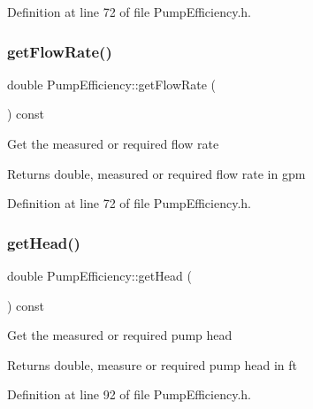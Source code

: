 Definition at line 72 of file Pump\+Efficiency.\+h.

\mbox{\label{class_pump_efficiency_a715c4ade497e99640f09546fad6479bc}} 
\subsubsection{\texorpdfstring{get\+Flow\+Rate()}{getFlowRate()}\hspace{0.1cm}{\footnotesize\ttfamily [3/3]}}
{\footnotesize\ttfamily double Pump\+Efficiency\+::get\+Flow\+Rate (\begin{DoxyParamCaption}{ }\end{DoxyParamCaption}) const\hspace{0.3cm}{\ttfamily [inline]}}

Get the measured or required flow rate

\begin{DoxyReturn}{Returns}
double, measured or required flow rate in gpm 
\end{DoxyReturn}


Definition at line 72 of file Pump\+Efficiency.\+h.

\mbox{\label{class_pump_efficiency_aa89f7727e67b3e0d20149eee66d10f69}} 
\subsubsection{\texorpdfstring{get\+Head()}{getHead()}\hspace{0.1cm}{\footnotesize\ttfamily [1/3]}}
{\footnotesize\ttfamily double Pump\+Efficiency\+::get\+Head (\begin{DoxyParamCaption}{ }\end{DoxyParamCaption}) const\hspace{0.3cm}{\ttfamily [inline]}}

Get the measured or required pump head

\begin{DoxyReturn}{Returns}
double, measure or required pump head in ft 
\end{DoxyReturn}


Definition at line 92 of file Pump\+Efficiency.\+h.

